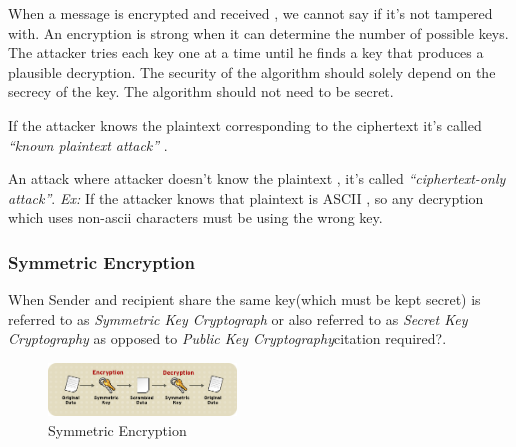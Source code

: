 \documentclass[a4paper]{article}
\begin{document}
When a message is encrypted and received , we cannot say if it's not tampered with. An encryption is strong when 
it can determine the number of possible keys. The attacker tries each key one at a time until he finds a key that 
produces a plausible decryption. The security of the algorithm should solely depend on the secrecy of the key. 
The algorithm should not need to be secret.

If the attacker knows the plaintext corresponding to the ciphertext it's called \textit{``known plaintext attack''} .

An attack where attacker doesn't know the plaintext , it's called \textit{``ciphertext-only attack''}.
\textit{Ex:} If the attacker knows that plaintext is ASCII , so any decryption which uses non-ascii characters must be using the wrong key.
\subsubsection{Symmetric Encryption}
When Sender and recipient share the same key(which must be kept secret) is referred to as \textit{Symmetric Key Cryptograph} or also
referred to as \textit{Secret Key Cryptography} as opposed to \textit{Public Key Cryptography}citation required?.
\begin{figure}[h]
    \centering
    \includegraphics[width=50mm]{symmetric.png}
    \caption{Symmetric Encryption ~\cite{RedHat:Symmetric}}
\end{figure}
\end{document}
